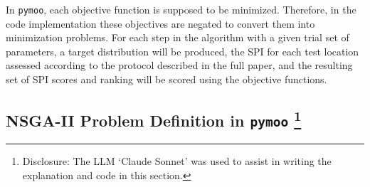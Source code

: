 \documentclass[
  authoryear,
  preprint,
  3p]{elsarticle}
\begin{document}
In \texttt{pymoo}, each objective function is supposed to be minimized.
Therefore, in the code implementation these objectives are negated to
convert them into minimization problems. For each step in the algorithm
with a given trial set of parameters, a target distribution will be
produced, the SPI for each test location assessed according to the
protocol described in the full paper, and the resulting set of SPI
scores and ranking will be scored using the objective functions.

\subsection[NSGA-II Problem Definition in \texttt{pymoo}
]{\texorpdfstring{NSGA-II Problem Definition in \texttt{pymoo}
\footnote{Disclosure: The LLM `Claude Sonnet' was used to assist in
  writing the explanation and code in this section.}}{NSGA-II Problem Definition in pymoo }}\label{nsga-ii-problem-definition-in-pymoo}
\end{document}
